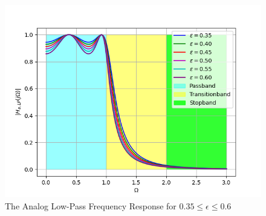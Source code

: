 \documentclass[article]{IEEEtran}
\theoremstyle{remark}
\numberwithin{equation}{subsection}
\begin{document}
\begin{enumerate}
\begin{figure}[!ht]
\includegraphics[width = \columnwidth]{figs/fig1.png}
\caption{The Analog Low-Pass Frequency Response for $0.35 \leq \epsilon \leq 0.6$}
\label{fig1}
\end{figure}



\end{enumerate}
\end{document}
